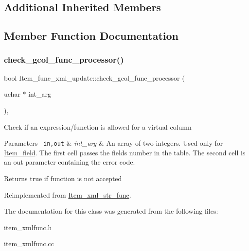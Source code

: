\subsection*{Additional Inherited Members}


\subsection{Member Function Documentation}
\mbox{\label{classItem__func__xml__update_aef4d74587e25de0b32a863ecc3b27214}} 
\subsubsection{\texorpdfstring{check\+\_\+gcol\+\_\+func\+\_\+processor()}{check\_gcol\_func\_processor()}}
{\footnotesize\ttfamily bool Item\+\_\+func\+\_\+xml\+\_\+update\+::check\+\_\+gcol\+\_\+func\+\_\+processor (\begin{DoxyParamCaption}\item[{uchar $\ast$}]{int\+\_\+arg }\end{DoxyParamCaption})\hspace{0.3cm}{\ttfamily [inline]}, {\ttfamily [virtual]}}

Check if an expression/function is allowed for a virtual column


\begin{DoxyParams}[1]{Parameters}
\mbox{\texttt{ in,out}}  & {\em int\+\_\+arg} & An array of two integers. Used only for \mbox{\hyperlink{classItem__field}{Item\+\_\+field}}. The first cell passes the field\textquotesingle{}s number in the table. The second cell is an out parameter containing the error code.\\
\hline
\end{DoxyParams}
\begin{DoxyReturn}{Returns}
true if function is not accepted 
\end{DoxyReturn}


Reimplemented from \mbox{\hyperlink{classItem__xml__str__func_aad586261f128e8819704b29bdf0c0470}{Item\+\_\+xml\+\_\+str\+\_\+func}}.



The documentation for this class was generated from the following files\+:\begin{DoxyCompactItemize}
\item 
item\+\_\+xmlfunc.\+h\item 
item\+\_\+xmlfunc.\+cc\end{DoxyCompactItemize}
